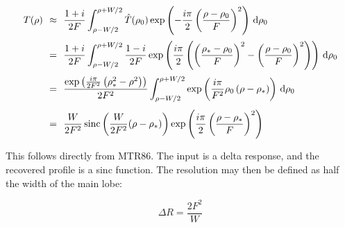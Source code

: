 \documentclass{article}
\begin{document}
    \begin{equation}
        \begin{array}{rcl}
            \displaystyle
            T(\rho)
            \!\!
            &\approx&
            \!\!
            \displaystyle
            \frac{1+i}{2F}
            \int_{\rho-W/2}^{\rho+W/2}
                \hat{T}(\rho_{0})
                \exp\left(
                    -\frac{i\pi}{2}\left(
                        \frac{\rho-\rho_{0}}{F}
                    \right)^{2}
                \right)\,\textrm{d}\rho_{0}\\[1.5em]
            \!\!
            &=&
            \!\!
            \displaystyle
            \frac{1+i}{2F}
            \int_{\rho-W/2}^{\rho+W/2}
                \frac{1-i}{2F}
                \exp\left(
                    \frac{i\pi}{2}\left(
                        \left(
                            \frac{\rho_{*}-\rho_{0}}{F}
                        \right)^{2}
                        -
                        \left(
                            \frac{\rho-\rho_{0}}{F}
                        \right)^{2}
                    \right)
                \right)\,\textrm{d}\rho_{0}\\[1.5em]
            \!\!
            &=&
            \!\!
            \displaystyle
            \frac{%
                \exp\left(%
                    \frac{i\pi}{2F^{2}}\left(\rho_{*}^{2}-\rho^{2}\right)%
                \right)
            }{2F^{2}}
            \int_{\rho-W/2}^{\rho+W/2}
                \exp\left(
                    \frac{i\pi}{F^{2}}\rho_{0}\left(\rho-\rho_{*}\right)
                \right)\,\textrm{d}\rho_{0}\\[1.5em]
            \!\!
            &=&
            \!\!
            \displaystyle
            \frac{W}{2F^{2}}\,
            \textrm{sinc}\left(
                \frac{W}{2F^{2}}(\rho-\rho_{*})
            \right)
            \exp\left(
                \frac{i\pi}{2}\left(
                    \frac{\rho-\rho_{*}}{F}
                \right)^{2}
            \right)
        \end{array}
    \end{equation}

    This follows directly from MTR86. The input is a delta response, and the
    recovered profile is a sinc function. The resolution may then be defined
    as half the width of the main lobe:

    \begin{equation}
        \Delta{R}
        =
        \frac{2F^{2}}{W}
    \end{equation}
\end{document}

